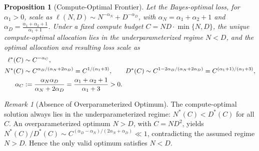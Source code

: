 \documentclass[11pt]{article}
\theoremstyle{plain}
\newtheorem{proposition}[theorem]{Proposition}
\theoremstyle{definition}
\theoremstyle{remark}
\newtheorem{remark}[theorem]{Remark}
\newcommand{\JSCheck}[1]{#1}
\begin{document}
\begin{proposition}[Compute-Optimal Frontier]
\label{prop:compute-optimal}
Let the Bayes-optimal loss, for $\alpha_1>0$, scale as  $\ell(N,D) \sim N^{-\alpha_N} + D^{-\alpha_D}$, with $\alpha_N = \alpha_1 + \alpha_2 + 1$ and $\alpha_D = \frac{\alpha_1 + \alpha_2 + 1}{\alpha_1 + 1}$. 
Under a fixed compute budget $C = N D \cdot \min\{N, D\}$, the unique compute-optimal allocation lies in the underparameterized regime \( N < D \), and the optimal allocation and resulting loss scale as
\begin{equation}
\begin{split}
\ell^*(C) &\sim C^{-\alpha_C}, \\
N^*(C) &\sim C^{\alpha_D/(\alpha_N+2\alpha_D)} = C^{1/(\alpha_1+3)}, \qquad
D^*(C) \sim C^{1-2\alpha_D/(\alpha_N+2\alpha_D)} = C^{(\alpha_1+1)/(\alpha_1+3)},\\
\alpha_C &:= \frac{\alpha_N\alpha_D}{\alpha_N+2\alpha_D}
= \frac{\alpha_1+\alpha_2+1}{\alpha_1+3} > 0 .
\end{split}
\label{eq:compute-opt-ND}
\raisetag{4ex}
\end{equation}
\end{proposition}





\begin{remark}[Absence of Overparameterized Optimum]\label{Remark:ComputeOverParam}
\JSCheck{The compute-optimal solution always lies in the underparameterized regime: $N^*(C) < D^*(C)$ for all $C$. An overparameterized optimum $N>D$, with $C=ND^2$, yields $N^*(C)/D^*(C) \sim C^{(\alpha_D-\alpha_N)/(2\alpha_N+\alpha_D)} \ll 1$, contradicting the assumed regime $N>D$. Hence the only valid optimum satisfies $N<D$.}
\end{remark}
\end{document}
